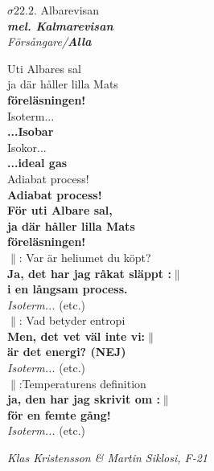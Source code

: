 \documentclass[a6paper,10pt]{article}
\newcommand{\mel}[1]{\small\textbf{\textit{mel. #1 \\}}}
\begin{document}
\setlength{\oddsidemargin}{-0.47in}
\begin{center}
\Large $\sigma22.2$. Albarevisan\\
\mel{Kalmarevisan} 
\small \textit{Försångare/\textbf{Alla}}
\end{center}

\small Uti Albares sal\\
ja där håller lilla Mats\\
\textbf{föreläsningen!}
\vspace{4pt}\\
Isoterm...\\
\textbf{...Isobar}\vspace{5pt}\\
Isokor...\\
\textbf{...ideal gas}\vspace{5pt}\\
Adiabat process!\\
\textbf{Adiabat process!}\vspace{5pt} \\
\textbf{För uti Albare sal,\\ ja där håller lilla Mats\\ föreläsningen!}\vspace{5pt}\\
$\|$: Var är heliumet du köpt? \\
\textbf{Ja, det har jag råkat släppt :$\|$ \\i en långsam process.}
\vspace{4pt} \\
\textit{Isoterm...} (etc.) 
\vspace{4pt} \\
$\|$: Vad betyder entropi\\
\textbf{Men, det vet väl inte vi:$\|$ \\är det energi? (NEJ)}
\vspace{4pt} \\
\textit{Isoterm...} (etc.)
\vspace{4pt} \\
$\|$:Temperaturens definition\\
\textbf{ja, den har jag skrivit om :$\|$ \\ för en femte gång!}
\vspace{4pt} \\
\textit{Isoterm...} (etc.) 
\begin{flushright}
\textit{Klas Kristensson \& Martin Siklosi, F-21}
\end{flushright}
\end{document}
